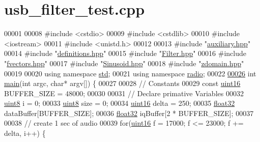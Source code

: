 \hypertarget{usb__filter__test_8cpp_source}{\section{usb\+\_\+filter\+\_\+test.\+cpp}
\label{usb__filter__test_8cpp_source}
}

\begin{DoxyCode}
00001 
00008 \textcolor{preprocessor}{#include <cstdio>}
00009 \textcolor{preprocessor}{#include <cstdlib>}
00010 \textcolor{preprocessor}{#include <iostream>}
00011 \textcolor{preprocessor}{#include <unistd.h>}
00012 
00013 \textcolor{preprocessor}{#include "\hyperlink{auxiliary_8hpp}{auxiliary.hpp}"}
00014 \textcolor{preprocessor}{#include "\hyperlink{definitions_8hpp}{definitions.hpp}"}
00015 \textcolor{preprocessor}{#include "\hyperlink{Filter_8hpp}{Filter.hpp}"}
00016 \textcolor{preprocessor}{#include "\hyperlink{fvectors_8hpp}{fvectors.hpp}"}
00017 \textcolor{preprocessor}{#include "\hyperlink{Sinusoid_8hpp}{Sinusoid.hpp}"}
00018 \textcolor{preprocessor}{#include "\hyperlink{zdomain_8hpp}{zdomain.hpp}"}
00019 
00020 \textcolor{keyword}{using namespace }\hyperlink{namespacestd}{std};
00021 \textcolor{keyword}{using namespace }\hyperlink{namespaceradio}{radio};
00022 
\hypertarget{usb__filter__test_8cpp_source_l00026}{}\hyperlink{usb__filter__test_8cpp_a0ddf1224851353fc92bfbff6f499fa97}{00026} \textcolor{keywordtype}{int} \hyperlink{usb__filter__test_8cpp_a0ddf1224851353fc92bfbff6f499fa97}{main}(\textcolor{keywordtype}{int} argc, \textcolor{keywordtype}{char}* argv[]) \{
00027 
00028     \textcolor{comment}{// Constants}
00029     \textcolor{keyword}{const} \hyperlink{definitions_8hpp_a05f6b0ae8f6a6e135b0e290c25fe0e4e}{uint16} BUFFER\_SIZE = 48000;
00030 
00031     \textcolor{comment}{// Declare primative Variables}
00032     \hyperlink{definitions_8hpp_adde6aaee8457bee49c2a92621fe22b79}{uint8} i = 0;
00033     \hyperlink{definitions_8hpp_adde6aaee8457bee49c2a92621fe22b79}{uint8} size = 0;
00034     \hyperlink{definitions_8hpp_a05f6b0ae8f6a6e135b0e290c25fe0e4e}{uint16} delta = 250;
00035     \hyperlink{definitions_8hpp_aacdc525d6f7bddb3ae95d5c311bd06a1}{float32} dataBuffer[BUFFER\_SIZE];
00036     \hyperlink{definitions_8hpp_aacdc525d6f7bddb3ae95d5c311bd06a1}{float32} iqBuffer[2 * BUFFER\_SIZE];
00037 
00038     \textcolor{comment}{// create 1 sec of audio}
00039     \textcolor{keywordflow}{for}(\hyperlink{definitions_8hpp_a05f6b0ae8f6a6e135b0e290c25fe0e4e}{uint16} f = 17000; f <= 23000; f += delta, i++) \{

\end{DoxyCode}
